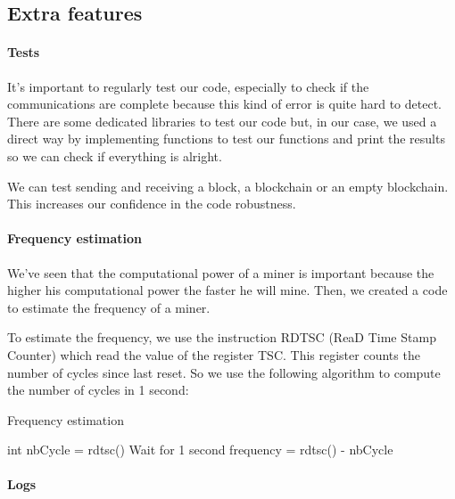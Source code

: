 \subsection{Extra features}

\paragraph{Tests}

It's important to regularly test our code, especially to check if the communications are complete because this kind of error is quite hard to detect. There are some dedicated libraries to test our code but, in our case, we used a direct way by implementing functions to test our functions and print the results so we can check if everything is alright. \newline

We can test sending and receiving a block, a blockchain or an empty blockchain. This increases our confidence in the code robustness.

\paragraph{Frequency estimation}

We've seen that the computational power of a miner is important because the higher his computational power the faster he will mine. Then, we created a code to estimate the frequency of a miner. \newline

To estimate the frequency, we use the instruction RDTSC (ReaD Time Stamp Counter) which read the value of the register TSC. This register counts the number of cycles since last reset. So we use the following algorithm to compute the number of cycles in 1 second: \newline

\begin{algorithm}
  \caption{Frequency estimation}

  \begin{algorithmic}
    \STATE int nbCycle = rdtsc()
    \STATE Wait for 1 second
    \STATE frequency = rdtsc() - nbCycle
  \end{algorithmic}
\end{algorithm}
\medskip

\paragraph{Logs}

